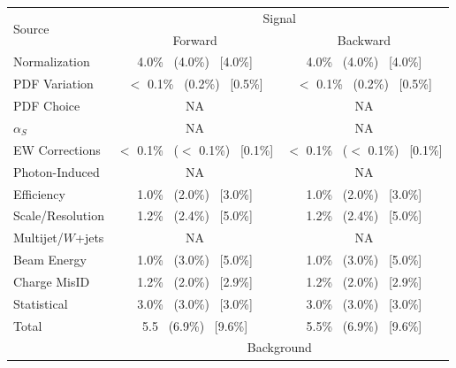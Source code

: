     \begin {table}[h]
        \begin{center}
        \begin{tabular}{ | l | c c | } 
            \hline
            \multirow{2}{*}{Source} & \multicolumn{2}{c|}{Signal}                                      \\
                                & Forward                           & Backward                        \\
            \hline
            Normalization       & 4.0\% ~(4.0\%) ~[4.0\%]           & 4.0\% ~(4.0\%) ~[4.0\%]         \\
            PDF Variation       & $<$ 0.1\% ~(0.2\%) ~[0.5\%]       & $<$ 0.1\% ~(0.2\%) ~[0.5\%]     \\
            PDF Choice          & NA                                & NA                              \\
            $\alpha_S$          & NA                                & NA                              \\
            EW Corrections      & $<$ 0.1\% ~($<$ 0.1\%) ~[0.1\%]   & $<$ 0.1\% ~($<$ 0.1\%) ~[0.1\%] \\
            Photon-Induced      & NA                                & NA                              \\
            Efficiency          & 1.0\% ~(2.0\%) ~[3.0\%]           & 1.0\% ~(2.0\%) ~[3.0\%]         \\
            Scale/Resolution    & 1.2\% ~(2.4\%) ~[5.0\%]           & 1.2\% ~(2.4\%) ~[5.0\%]         \\
            Multijet/$W$+jets  & NA                                & NA                              \\
            Beam Energy         & 1.0\% ~(3.0\%) ~[5.0\%]           & 1.0\% ~(3.0\%) ~[5.0\%]         \\
            Charge MisID        & 1.2\% ~(2.0\%) ~[2.9\%]           &  1.2\% ~(2.0\%) ~[2.9\%]        \\
            Statistical         & 3.0\% ~(3.0\%) ~[3.0\%]           & 3.0\% ~(3.0\%) ~[3.0\%]         \\
            \hline  
            Total               & 5.5 ~(6.9\%) ~[9.6\%]             & 5.5\% ~(6.9\%) ~[9.6\%]        \\
            \hline
            \hline
                                & \multicolumn{2}{c|}{Background}                                    \\

\end{tabular}
\end{center}
\end{table}
